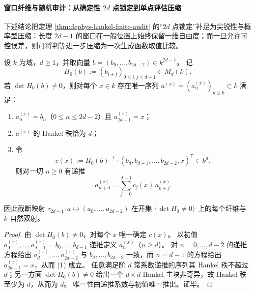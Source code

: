 \paragraph{窗口纤维与随机审计：从确定性 \texorpdfstring{$2d$}{2d} 点锁定到单点评估压缩}
\label{par:xi-hankel-window-fiber-random-audit}
下述结论把定理 \ref{thm:dephys-hankel-finite-audit} 的“\(2d\) 点锁定”补足为尖锐性与概率型压缩：长度 \(2d-1\) 的窗口在一般位置上始终保留一维自由度；而一旦允许可控误差，则可将判等进一步压缩为一次生成函数取值比较。

\begin{proposition}\label{prop:xi-hankel-window-fiber-1d}
设 \(k\) 为域，\(d\ge 1\)，并取向量
\(
b=(b_0,\dots,b_{2d-2})\in k^{2d-1}
\)。
记
\[
H_0(b):=(b_{i+j})_{0\le i,j\le d-1}\in M_d(k).
\]
若 \(\det H_0(b)\neq 0\)，则对每个 \(x\in k\) 存在唯一序列 \(a^{(x)}=(a^{(x)}_n)_{n\ge 0}\subset k\) 满足：
\begin{enumerate}
  \item \(a^{(x)}_n=b_n\)（\(0\le n\le 2d-2\)）且 \(a^{(x)}_{2d-1}=x\)；
  \item \(a^{(x)}\) 的 Hankel 秩恰为 \(d\)；
  \item 令
  \[
  c(x):=H_0(b)^{-1}\cdot (b_d,b_{d+1},\dots,b_{2d-2},x)^{\mathsf T}\in k^d,
  \]
  则对一切 \(n\ge 0\) 有递推
  \[
  a^{(x)}_{n+d}=\sum_{j=0}^{d-1} c_j(x)\,a^{(x)}_{n+j}.
  \]
\end{enumerate}
因此截断映射 \(\tau_{2d-1}:a\mapsto(a_0,\dots,a_{2d-2})\) 在开集 \(\{\det H_0\neq 0\}\) 上的每个纤维与 \(k\) 自然双射。
\end{proposition}
\begin{proof}
由 \(\det H_0(b)\neq 0\)，对每个 \(x\) 唯一确定 \(c(x)\)。
以初值 \(a^{(x)}_0,\dots,a^{(x)}_{d-1}=b_0,\dots,b_{d-1}\) 递推定义 \(a^{(x)}_n\)（\(n\ge d\)）。
对 \(n=0,\dots,d-2\) 的递推方程给出 \(a^{(x)}_d,\dots,a^{(x)}_{2d-2}\) 与 \(b_d,\dots,b_{2d-2}\) 一致，而 \(n=d-1\) 的方程给出 \(a^{(x)}_{2d-1}=x\)，从而 (1) 成立。
任意满足阶 \(d\) 常系数递推的序列其 Hankel 秩不超过 \(d\)；另一方面 \(\det H_0(b)\neq 0\) 给出一个 \(d\times d\) Hankel 主块非奇异，故 Hankel 秩至少为 \(d\)，从而为 \(d\)。
唯一性由递推系数与初值唯一推出。证毕。
\end{proof}




